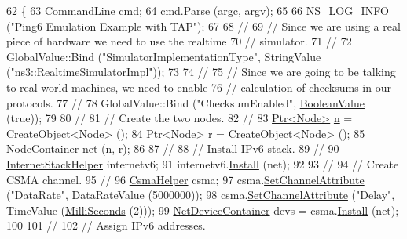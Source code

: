 \begin{DoxyCode}
62 \{
63   \hyperlink{classns3_1_1CommandLine}{CommandLine} cmd;
64   cmd.\hyperlink{classns3_1_1CommandLine_a5c10b85b3207e5ecb48d907966923156}{Parse} (argc, argv);
65   
66   \hyperlink{group__logging_gafbd73ee2cf9f26b319f49086d8e860fb}{NS\_LOG\_INFO} (\textcolor{stringliteral}{"Ping6 Emulation Example with TAP"});
67 
68   \textcolor{comment}{//}
69   \textcolor{comment}{// Since we are using a real piece of hardware we need to use the realtime}
70   \textcolor{comment}{// simulator.}
71   \textcolor{comment}{//}
72   GlobalValue::Bind (\textcolor{stringliteral}{"SimulatorImplementationType"}, StringValue (\textcolor{stringliteral}{"ns3::RealtimeSimulatorImpl"}));
73 
74   \textcolor{comment}{//}
75   \textcolor{comment}{// Since we are going to be talking to real-world machines, we need to enable}
76   \textcolor{comment}{// calculation of checksums in our protocols.}
77   \textcolor{comment}{//}
78   GlobalValue::Bind (\textcolor{stringliteral}{"ChecksumEnabled"}, \hyperlink{classns3_1_1BooleanValue}{BooleanValue} (\textcolor{keyword}{true}));
79 
80   \textcolor{comment}{//}
81   \textcolor{comment}{// Create the two nodes.}
82   \textcolor{comment}{//}
83   \hyperlink{classns3_1_1Ptr}{Ptr<Node>} \hyperlink{namespacesample-rng-plot_aeb5ee5c431e338ef39b7ac5431242e1d}{n} = CreateObject<Node> ();
84   \hyperlink{classns3_1_1Ptr}{Ptr<Node>} r = CreateObject<Node> ();
85   \hyperlink{classns3_1_1NodeContainer}{NodeContainer} net (n, r);
86 
87   \textcolor{comment}{//}
88   \textcolor{comment}{// Install IPv6 stack.}
89   \textcolor{comment}{//}
90   \hyperlink{classns3_1_1InternetStackHelper}{InternetStackHelper} internetv6;
91   internetv6.\hyperlink{classns3_1_1InternetStackHelper_a6645b412f31283d2d9bc3d8a95cebbc0}{Install} (net);
92 
93   \textcolor{comment}{//}
94   \textcolor{comment}{// Create CSMA channel.}
95   \textcolor{comment}{//}
96   \hyperlink{classns3_1_1CsmaHelper}{CsmaHelper} csma;
97   csma.\hyperlink{classns3_1_1CsmaHelper_a886d900b2fe44433e0b81752dea7e7f1}{SetChannelAttribute} (\textcolor{stringliteral}{"DataRate"}, DataRateValue (5000000));
98   csma.\hyperlink{classns3_1_1CsmaHelper_a886d900b2fe44433e0b81752dea7e7f1}{SetChannelAttribute} (\textcolor{stringliteral}{"Delay"}, TimeValue (\hyperlink{group__timecivil_gaf26127cf4571146b83a92ee18679c7a9}{MilliSeconds} (2)));
99   \hyperlink{classns3_1_1NetDeviceContainer}{NetDeviceContainer} devs = csma.\hyperlink{classns3_1_1CsmaHelper_af79a91372595230b0817200270ab84e7}{Install} (net);
100 
101   \textcolor{comment}{//}
102   \textcolor{comment}{// Assign IPv6 addresses.}

\end{DoxyCode}
